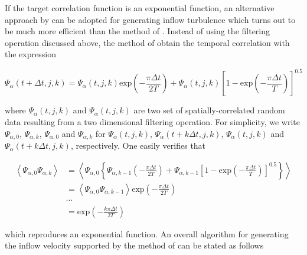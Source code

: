 If the target correlation function is an exponential function, an alternative approach by \cite{xie2008} can be adopted for generating inflow turbulence which turns out to be much more efficient than the method of \cite{klein2003}. Instead of using the filtering operation discussed above, the method of \cite{xie2008} obtain the temporal correlation with the expression

\begin{equation} \label{temporalCorrelation}
\Psi_{\alpha}(t+\Delta t,j,k) = \Psi_{\alpha}(t,j,k)\mathrm{exp}\left(-\frac{\pi \Delta t}{2T} \right)+\varPsi_{\alpha}(t,j,k)\left[1-\mathrm{exp}\left(-\frac{\pi \Delta t}{T} \right)\right]^{0.5}
\end{equation}

\noindent where $\Psi_{\alpha}(t,j,k)$ and $\varPsi_{\alpha}(t,j,k)$ are two set of spatially-correlated random data resulting from a two dimensional filtering operation. For simplicity, we write $\Psi_{\alpha,0}$, $\Psi_{\alpha,k}$, $\varPsi_{\alpha,0}$ and $\varPsi_{\alpha,k}$ for $\Psi_{\alpha}(t,j,k)$, $\Psi_{\alpha}(t+k\Delta t,j,k)$, $\varPsi_{\alpha}(t,j,k)$ and $\varPsi_{\alpha}(t+k\Delta t,j,k)$, respectively. One easily verifies that

\begin{equation}
\begin{split}
\left\langle \Psi_{\alpha,0}\Psi_{\alpha,k} \right\rangle &= \left\langle \Psi_{\alpha,0}\left\{\Psi_{\alpha,k-1}\left(-\frac{\pi \Delta t}{2T} \right)+ \varPsi_{\alpha,k-1}\left[1-\mathrm{exp}\left(-\frac{\pi \Delta t}{T} \right)\right]^{0.5}\right\}\right\rangle \\
& = \left\langle \Psi_{\alpha,0} \Psi_{\alpha,k-1} \right\rangle \mathrm{exp}\left(-\frac{\pi \Delta t}{2T}\right) \\
& \cdots \\
& = \mathrm{exp}\left(-\frac{k\pi \Delta t}{2T}\right)
\end{split}
\end{equation}

\noindent which reproduces an exponential function. An overall algorithm for generating the inflow velocity supported by the method of \cite{xie2008} can be stated as follows

